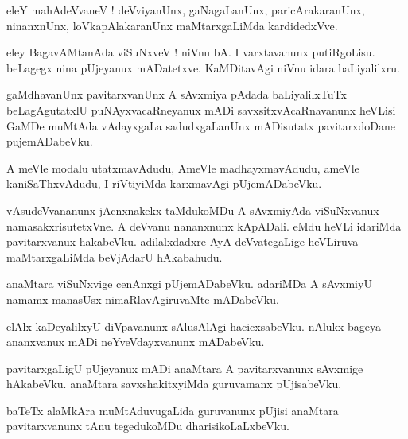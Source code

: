 \documentclass{article}
\begin{document}
\begin{mn}%
eleY mahAdeVvaneV ! deVviyanUnx, gaNagaLanUnx, paricArakaranUnx, ninanxnUnx, loVkapAlakaranUnx 
maMtarxgaLiMda kardidedxVve.
\end{mn}

\begin{mn}%
eley BagavAMtanAda viSuNxveV ! niVnu bA. I varxtavanunx putiRgoLisu. beLagegx nina pUjeyanux 
mADatetxve. KaMDitavAgi niVnu idara baLiyalilxru.
\end{mn}

\begin{mn}%
gaMdhavanUnx pavitarxvanUnx A sAvxmiya pAdada baLiyalilxTuTx beLagAgutatxlU puNAyxvacaRneyanux mADi 
savxsitxvAcaRnavanunx heVLisi GaMDe muMtAda vAdayxgaLa sadudxgaLanUnx mADisutatx pavitarxdoDane 
pujemADabeVku.
\end{mn}

\begin{mn}%
 A meVle modalu utatxmavAdudu, AmeVle madhayxmavAdudu, ameVle kaniSaThxvAdudu, I riVtiyiMda 
 karxmavAgi pUjemADabeVku.
\end{mn}

\begin{mn}%
vAsudeVvananunx jAcnxnakekx taMdukoMDu A sAvxmiyAda viSuNxvanux namasakxrisutetxVne. A deVvanu 
nananxnunx kApADali. eMdu heVLi idariMda pavitarxvanux hakabeVku. adilalxdadxre AyA deVvategaLige 
heVLiruva maMtarxgaLiMda beVjAdarU hAkabahudu.
\end{mn}

\begin{mn}%
anaMtara viSuNxvige cenAnxgi pUjemADabeVku. adariMDa A sAvxmiyU namamx manasUsx nimaRlavAgiruvaMte 
mADabeVku.
\end{mn}

\begin{mn}%
elAlx kaDeyalilxyU diVpavanunx sAlusAlAgi hacicxsabeVku. nAlukx bageya ananxvanux mADi 
neYveVdayxvanunx mADabeVku.
\end{mn}

\begin{mn}%
pavitarxgaLigU pUjeyanux mADi anaMtara A pavitarxvanunx sAvxmige hAkabeVku. anaMtara 
savxshakitxyiMda guruvamanx pUjisabeVku.
\end{mn}

\begin{mn}%
baTeTx alaMkAra muMtAduvugaLida guruvanunx pUjisi anaMtara pavitarxvanunx tAnu tegedukoMDu 
dharisikoLaLxbeVku.
\end{mn}
\end{document}
